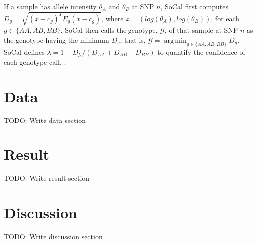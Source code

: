 \documentclass{scrartcl}
\begin{document}
\par
If a sample has allele intensity $\theta_A$ and $\theta_B$ at SNP $n$,
SoCal first computes
$D_g=\sqrt{(x-c_g)^TE_g(x-c_g)}$,
where $x=(log(\theta_A), log(\theta_B))$, for each $g\in\{AA,AB,BB\}$.
SoCal then calls the genotype, $\mathcal{G}$, of that sample at SNP $n$
as the genotype having the minimum $D_g$, that is,
$\mathcal{G}=\operatorname*{arg\,min}_{g\in \{AA,AB,BB\}}D_g$.
SoCal defines $\lambda=1-D_{\mathcal{G}}/(D_{AA}+D_{AB}+D_{BB})$ to quantify
the confidence of each genotype call, . 











\section{Data}
TODO: Write data section












\section{Result}
TODO: Write result section













\section{Discussion}
TODO: Write discussion section

\end{document}
